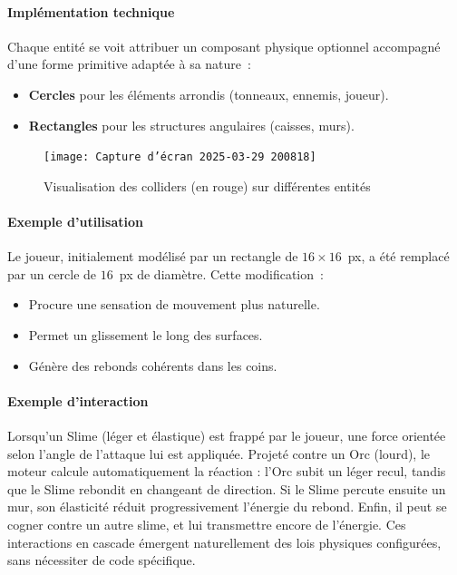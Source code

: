 \documentclass[a4paper,11pt]{article}
\begin{document}
\paragraph{Implémentation technique} 
Chaque entité se voit attribuer un composant physique optionnel accompagné d'une forme primitive adaptée à sa nature~:
\begin{itemize}
    \item \textbf{Cercles} pour les éléments arrondis (tonneaux, ennemis, joueur).
    \item \textbf{Rectangles} pour les structures angulaires (caisses, murs).
\end{itemize}
\begin{figure}[ht]
    \centering
    \texttt{[image: Capture d'écran 2025-03-29 200818]}
    \caption{Visualisation des colliders (en rouge) sur différentes entités}
    \label{fig:colliders_exemple}
\end{figure}

\paragraph{Exemple d'utilisation} 
Le joueur, initialement modélisé par un rectangle de \(16 \times 16\)~px, a été remplacé par un cercle de \(16\)~px de diamètre. Cette modification~:
\begin{itemize}
    \item Procure une sensation de mouvement plus naturelle.
    \item Permet un glissement le long des surfaces.
    \item Génère des rebonds cohérents dans les coins.
\end{itemize}

\paragraph{Exemple d'interaction}  
Lorsqu’un Slime (léger et élastique) est frappé par le joueur, une force orientée selon l’angle de l’attaque lui est appliquée. Projeté contre un Orc (lourd), le moteur calcule automatiquement la réaction : l’Orc subit un léger recul, tandis que le Slime rebondit en changeant de direction. Si le Slime percute ensuite un mur, son élasticité réduit progressivement l’énergie du rebond. Enfin, il peut se cogner contre un autre slime, et lui transmettre encore de l’énergie. Ces interactions en cascade émergent naturellement des lois physiques configurées, sans nécessiter de code spécifique.
\end{document}
